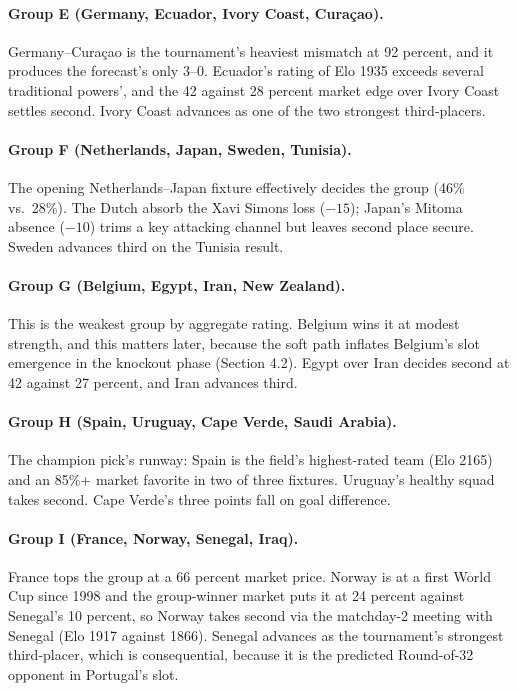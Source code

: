 \documentclass[11pt,letterpaper]{article}
\begin{document}


\paragraph{Group E (Germany, Ecuador, Ivory Coast, Curaçao).} Germany--Curaçao is the tournament's heaviest mismatch at 92 percent, and it produces the forecast's only 3--0. Ecuador's rating of Elo 1935 exceeds several traditional powers', and the 42 against 28 percent market edge over Ivory Coast settles second. Ivory Coast advances as one of the two strongest third-placers.




\paragraph{Group F (Netherlands, Japan, Sweden, Tunisia).} The opening Netherlands--Japan fixture effectively decides the group (46\% vs.\ 28\%). The Dutch absorb the Xavi Simons loss ($-15$); Japan's Mitoma absence ($-10$) trims a key attacking channel but leaves second place secure. Sweden advances third on the Tunisia result.




\paragraph{Group G (Belgium, Egypt, Iran, New Zealand).} This is the weakest group by aggregate rating. Belgium wins it at modest strength, and this matters later, because the soft path inflates Belgium's slot emergence in the knockout phase (Section 4.2). Egypt over Iran decides second at 42 against 27 percent, and Iran advances third.




\paragraph{Group H (Spain, Uruguay, Cape Verde, Saudi Arabia).} The champion pick's runway: Spain is the field's highest-rated team (Elo 2165) and an 85\%+ market favorite in two of three fixtures. Uruguay's healthy squad takes second. Cape Verde's three points fall on goal difference.




\paragraph{Group I (France, Norway, Senegal, Iraq).} France tops the group at a 66 percent market price. Norway is at a first World Cup since 1998 and the group-winner market puts it at 24 percent against Senegal's 10 percent, so Norway takes second via the matchday-2 meeting with Senegal (Elo 1917 against 1866). Senegal advances as the tournament's strongest third-placer, which is consequential, because it is the predicted Round-of-32 opponent in Portugal's slot.
\end{document}
